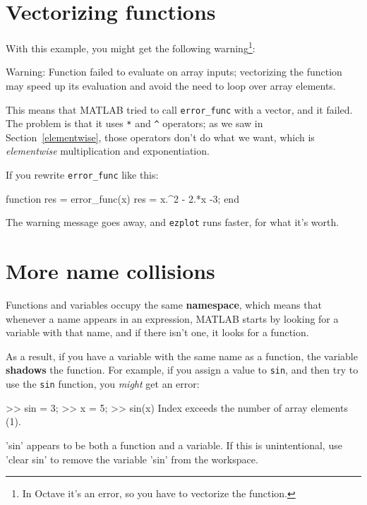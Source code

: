 \documentclass[
]{book}
\numberwithin{Answer}{chapter}
\numberwithin{Exercise}{chapter}
\begin{document}
\section{Vectorizing functions}

With this example, you might get the following warning\footnote{In Octave it's an error, so you have to vectorize the function.}:

\begin{code}
Warning: Function failed to evaluate on array inputs;
vectorizing the function may speed up its evaluation and 
avoid the need to loop over array elements. 
\end{code}

This means that MATLAB tried to call \verb"error_func" with a vector, and it failed. 
The problem is that it uses \verb"*" and \verb"^" operators; as we saw in Section~\ref{elementwise}, those operators don't do what we want, which is {\em elementwise} multiplication and exponentiation.

If you rewrite \verb"error_func" like this:

\begin{code}
function res = error_func(x)
    res = x.^2 - 2.*x -3;
end
\end{code}

The warning message goes away, and {\tt ezplot} runs faster, for what it's worth.



\section{More name collisions}

Functions and variables occupy the same {\bf namespace}, which means
that whenever a name appears in an expression, MATLAB starts by looking
for a variable with that name, and if there isn't one, it looks for
a function.

As a result, if you have a variable with the same name as a function,
the variable {\bf shadows} the function.  For example, if you assign
a value to {\tt sin}, and then try to use the {\tt sin} function, you
{\em might} get an error:

\begin{code}
>> sin = 3;
>> x = 5;
>> sin(x)
Index exceeds the number of array elements (1).

'sin' appears to be both a function and a variable.
If this is unintentional, use 'clear sin' to remove 
the variable 'sin' from the workspace.
\end{code}
\end{document}
